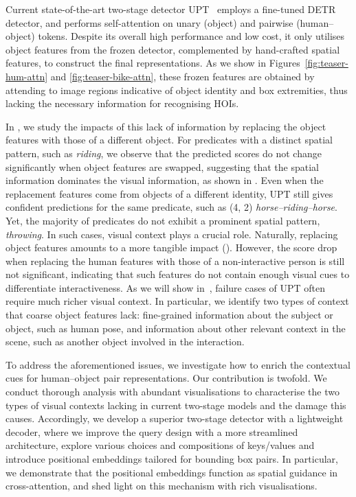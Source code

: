 \documentclass[10pt,twocolumn,letterpaper]{article}
\begin{document}
Current state-of-the-art two-stage detector UPT~\cite{upt} employs a fine-tuned DETR detector, and performs self-attention on unary (object) and pairwise (human--object) tokens. Despite its overall high performance and low cost, it only utilises object features from the frozen detector, complemented by hand-crafted spatial features, to construct the final representations. As we show in Figures~\ref{fig:teaser-hum-attn} and \ref{fig:teaser-bike-attn}, these frozen features are obtained by attending to image regions indicative of object identity and box extremities, thus lacking the necessary information for recognising HOIs.

In , we study the impacts of this lack of information by replacing the object features with those of a different object.
For predicates with a distinct spatial pattern, such as \textit{riding}, we observe that the predicted scores do not change significantly when object features are swapped, suggesting that the spatial information dominates the visual information, as shown in .
Even when the replacement features come from objects of a different identity, UPT still gives confident predictions for the same predicate, such as (4, 2) \textit{horse--riding--horse}. Yet, the majority of predicates do not exhibit a prominent spatial pattern, \eg \textit{throwing}. In such cases, visual context plays a crucial role. Naturally, replacing object features amounts to a more tangible impact (). However, the score drop when replacing the human features with those of a non-interactive person is still not significant, indicating that such features do not contain enough visual cues to differentiate interactiveness. As we will show in~, failure cases of UPT often require much richer visual context. In particular, we identify two types of context that coarse object features lack: 
fine-grained information about the subject or object, such as human pose, and information about other relevant context in the scene, such as another object involved in the interaction.

To address the aforementioned issues, we investigate how to enrich the contextual cues for human--object pair representations. Our contribution is twofold. We conduct thorough analysis with abundant visualisations to characterise the two types of visual contexts lacking in current two-stage models and the damage this causes. Accordingly, we develop a superior two-stage detector with a lightweight decoder, where we improve the query design with a more streamlined architecture, explore various choices and compositions of keys/values and introduce positional embeddings tailored for bounding box pairs. In particular, we demonstrate that the positional embeddings function as spatial guidance in cross-attention, and shed light on this mechanism with rich visualisations.
\end{document}
